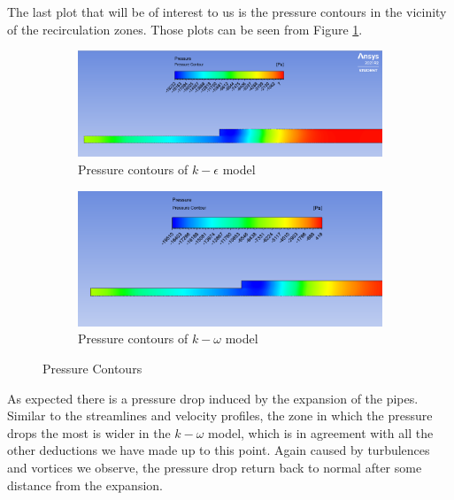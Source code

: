 \noindent The last plot that will be of interest to us is the pressure contours in the vicinity of the recirculation zones. Those plots can be seen from Figure \ref{fig:press_task2}.

\begin{figure}[H]
    \centering
    \begin{subfigure}{.85\textwidth}
    \centering
    \includegraphics[width=.9\linewidth]{images/task2/task2-1/2-1pressure.png}
    \caption{Pressure contours of $k-\epsilon$ model}
    \end{subfigure}
    
\begin{subfigure}{.85\textwidth}
    \centering
    \includegraphics[width=.9\linewidth]{images/task2/task2-2/2-2pressure.png}
    \caption{Pressure contours of $k-\omega$ model}
\end{subfigure}
    \caption{Pressure Contours}
    \label{fig:press_task2}
\end{figure}


\noindent As expected there is a pressure drop induced by the expansion of the pipes. Similar to the streamlines and velocity profiles, the zone in which the pressure drops the most is wider in the $k-\omega$ model, which is in agreement with all the other deductions we have made up to this point. Again caused by turbulences and vortices we observe, the pressure drop return back to normal after some distance from the expansion.